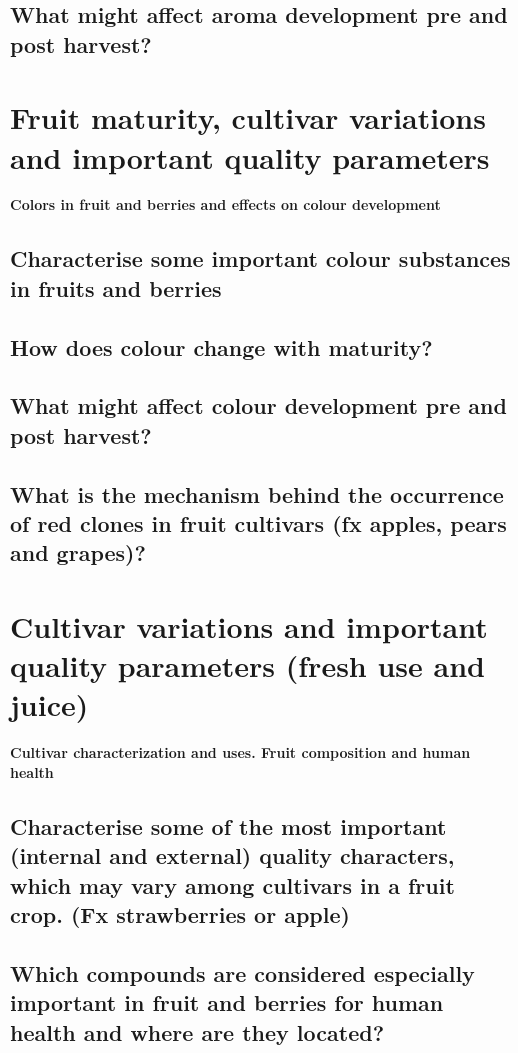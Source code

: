 \subsection{What might affect aroma development pre and post harvest?}


\vspace{1em}
\section{Fruit maturity, cultivar variations and important quality parameters}
\textbf{Colors in fruit and berries and effects on colour development}

\subsection{Characterise some important colour substances in fruits and berries}
\subsection{How does colour change with maturity?}
\subsection{What might affect colour development pre and post harvest?}
\subsection{What is the mechanism behind the occurrence of red clones in fruit cultivars (fx apples, pears and grapes)?}


\vspace{1em}
\section{Cultivar variations and important quality parameters (fresh use and juice)} 
\textbf{Cultivar characterization and uses. Fruit composition and human health}

\subsection{Characterise some of the most important (internal and external) quality characters, which may vary among cultivars in a fruit crop. (Fx strawberries or apple)}
\subsection{Which compounds are considered especially important in fruit and berries for human health and where are they located? }

